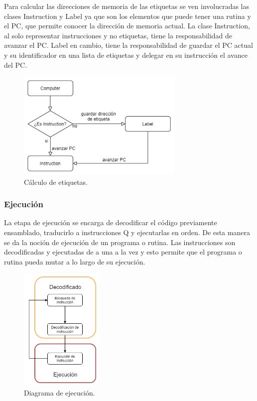 Para calcular las direcciones de memoria de las etiquetas se ven involucradas las clases Instruction y Label ya que son los elementos que puede
tener una rutina y el PC, que permite conocer la dirección de memoria actual. La clase Instruction, al solo representar instrucciones y no etiquetas, tiene la responsabilidad de avanzar el PC. Label en cambio,
tiene la responsabilidad de guardar el PC actual y su identificador en una lista de etiquetas y delegar en su instrucción el avance del PC.

\begin{figure}[H]
  \centering
  \includegraphics[width=8cm]{figuras/calculo-de-etiquetas.png}
  \caption{Cálculo de etiquetas.}
\end{figure}


\subsubsection*{Ejecución}

La etapa de ejecución se encarga de decodificar el código previamente ensamblado, traducirlo a instrucciones Q y ejecutarlas en orden.
De esta manera se da la noción de ejecución de un programa o rutina. Las instrucciones son decodificadas y ejecutadas de a una a la vez y esto permite
que el programa o rutina pueda mutar a lo largo de su ejecución. 

\begin{figure}[H]
  \centering
  \includegraphics[width=4cm]{figuras/diagrama_ejecucion.png}
  \caption{Diagrama de ejecución.}
\end{figure}

